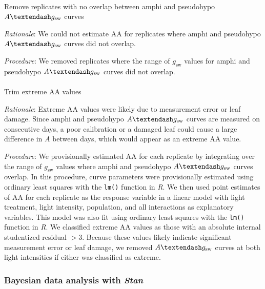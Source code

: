 \documentclass[
  letterpaper,
  DIV=11,
  numbers=noendperiod]{scrartcl}
\makeatletter
\let\oldparagraph\paragraph
\renewcommand{\paragraph}{
    \@ifstar
      \xxxParagraphStar
      \xxxParagraphNoStar
  }
\newcommand{\xxxParagraphStar}[1]{\oldparagraph*{#1}\mbox{}}
\newcommand{\xxxParagraphNoStar}[1]{\oldparagraph{#1}\mbox{}}
\newcommand{\aax}{$\mathrm{AA}$}
\newcommand{\agcurve}{$A \textendash g_\text{sw}$}
\newcommand{\gsw}{$g_\text{sw}$}
\makeatother
\begin{document}
\paragraph{\texorpdfstring{Remove replicates with no overlap between
amphi and pseudohypo \agcurve{}
curves}{Remove replicates with no overlap between amphi and pseudohypo  curves}}\label{remove-replicates-with-no-overlap-between-amphi-and-pseudohypo-curves}

\emph{Rationale}: We could not estimate \aax{} for replicates where
amphi and pseudohypo \agcurve{} curves did not overlap.

\emph{Procedure}: We removed replicates where the range of \gsw{} values
for amphi and pseudohypo \agcurve{} curves did not overlap.

\paragraph{\texorpdfstring{Trim extreme \aax{}
values}{Trim extreme  values}}\label{trim-extreme-values}

\emph{Rationale}: Extreme \aax{} values were likely due to measurement
error or leaf damage. Since amphi and pseudohypo \agcurve{} curves are
measured on consecutive days, a poor calibration or a damaged leaf could
cause a large difference in \(A\) between days, which would appear as an
extreme \aax{} value.

\emph{Procedure}: We provisionally estimated \aax{} for each replicate
by integrating over the range of \gsw{} values where amphi and
pseudohypo \agcurve{} curves overlap. In this procedure, curve
parameters were provisionally estimated using ordinary least squares
with the \texttt{lm()} function in \emph{R}. We then used point
estimates of \aax{} for each replicate as the response variable in a
linear model with light treatment, light intensity, population, and all
interactions as explanatory variables. This model was also fit using
ordinary least squares with the \texttt{lm()} function in \emph{R}. We
classified extreme \aax{} values as those with an absolute internal
studentized residual \(> 3\). Because these values likely indicate
significant measurement error or leaf damage, we removed \agcurve{}
curves at both light intensities if either was classified as extreme.

\subsubsection{\texorpdfstring{Bayesian data analysis with
\emph{Stan}}{Bayesian data analysis with Stan}}\label{sec-analysis}
\end{document}
